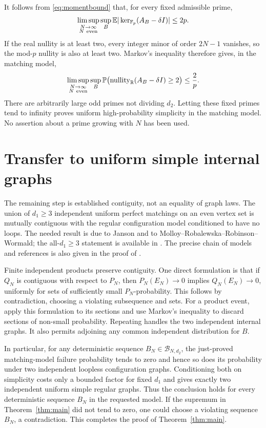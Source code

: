 \documentclass[11pt]{article}
\newcommand{\Fp}{\mathbb F_p}
\newcommand{\E}{\mathbb E}
\newcommand{\Prob}{\mathbb P}
\newcommand{\nullity}{\operatorname{nullity}}
\begin{document}
It follows from \eqref{eq:momentbound} that, for every fixed admissible prime,
\[
 \limsup_{\substack{N\to\infty\\N\ {\rm even}}}
 \sup_B\E|\ker_{\Fp}(A_B-\delta I)|\le2p.
\]
If the real nullity is at least two, every integer minor of order $2N-1$ vanishes, so the mod-$p$ nullity is also at least two. Markov's inequality therefore gives, in the matching model,
\[
 \limsup_{\substack{N\to\infty\\N\ {\rm even}}}
 \sup_B\Prob\bigl(\nullity_{\mathbb R}(A_B-\delta I)\ge2\bigr)
 \le\frac2p.
\]
There are arbitrarily large odd primes not dividing $d_2$. Letting these fixed primes tend to infinity proves uniform high-probability simplicity in the matching model. No assertion about a prime growing with $N$ has been used.

\section{Transfer to uniform simple internal graphs}
The remaining step is established contiguity, not an equality of graph laws. The union of $d_1\ge3$ independent uniform perfect matchings on an even vertex set is mutually contiguous with the regular configuration model conditioned to have no loops. The needed result is due to Janson and to Molloy--Robalewska--Robinson--Wormald; the all-$d_1\ge3$ statement is available in \cite[Theorem 3]{mrrw}. The precise chain of models and references is also given in the proof of \cite[Theorem 1.6, Section 4, PDF p.~8]{nw}.

Finite independent products preserve contiguity. One direct formulation is that if $Q_N$ is contiguous with respect to $P_N$, then $P_N(E_N)\to0$ implies $Q_N(E_N)\to0$, uniformly for sets of sufficiently small $P_N$-probability. This follows by contradiction, choosing a violating subsequence and sets. For a product event, apply this formulation to its sections and use Markov's inequality to discard sections of non-small probability. Repeating handles the two independent internal graphs. It also permits adjoining any common independent distribution for $B$.

In particular, for any deterministic sequence $B_N\in\mathcal B_{N,d_2}$, the just-proved matching-model failure probability tends to zero and hence so does its probability under two independent loopless configuration graphs. Conditioning both on simplicity costs only a bounded factor for fixed $d_1$ and gives exactly two independent uniform simple regular graphs. Thus the conclusion holds for every deterministic sequence $B_N$ in the requested model. If the supremum in Theorem~\ref{thm:main} did not tend to zero, one could choose a violating sequence $B_N$, a contradiction. This completes the proof of Theorem~\ref{thm:main}.
\end{document}
